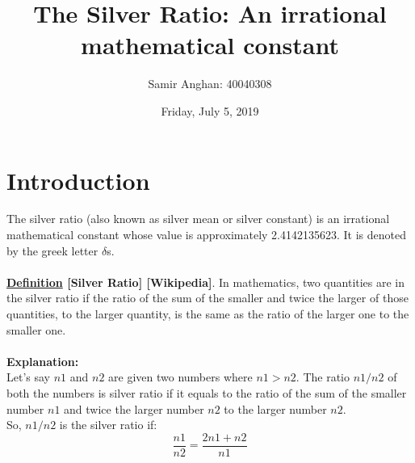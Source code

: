 \documentclass[letterpaper]{article}
\title{The Silver Ratio: An irrational mathematical constant}
\author{Samir Anghan: 40040308}
\date{Friday, July 5, 2019}
\begin{document}
\maketitle

\section{Introduction}
The silver ratio (also known as silver mean or silver constant) is an irrational mathematical constant whose value is approximately 2.4142135623. It is denoted by the greek letter $\delta$s. \\ \\
\textbf{\underline{Definition} [Silver Ratio] [Wikipedia]}. In mathematics, two quantities are in the silver ratio if the ratio of the sum of the smaller and twice the larger of those quantities, to the larger quantity, is the same as the ratio of the larger one to the smaller one. \\ \\
\textbf{Explanation:} \\
Let's say $n1$ and $n2$ are given two numbers where $ n1 > n2 $. The ratio $n1/n2$ of both the numbers is silver ratio if it equals to the ratio of the sum of the smaller number $n1$ and twice the larger number $n2$ to the larger number $n2$. \\
So, $n1/n2$ is the silver ratio if: \\

\[\frac{n1}{n2}=\frac{2n1 + n2}{n1} \]
\end{document}
